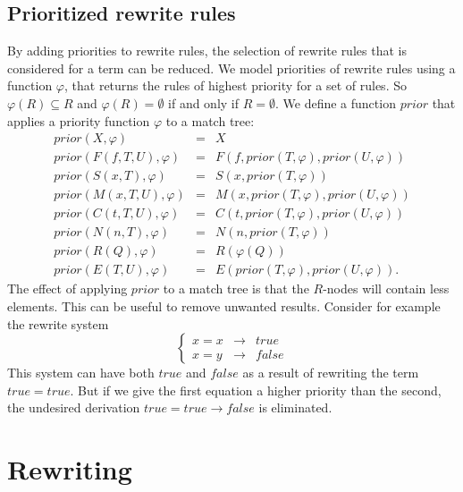 \documentclass{article}
\begin{document}
\subsection{Prioritized rewrite rules}

By adding priorities to rewrite rules, the selection of rewrite rules that
is considered for a term can be reduced. We model priorities of rewrite
rules using a function $\varphi $, that returns the rules of highest
priority for a set of rules. So $\varphi (R)\subseteq R$ and $\varphi
(R)=\emptyset $ if and only if $R=\emptyset $. We define a function $prior$
that applies a priority function $\varphi $ to a match tree:%
\begin{equation*}
\begin{array}{lll}
prior(X,\varphi ) & = & X \\ 
prior(F(f,T,U),\varphi ) & = & F(f,prior(T,\varphi ),prior(U,\varphi )) \\ 
prior(S(x,T),\varphi ) & = & S(x,prior(T,\varphi )) \\ 
prior(M(x,T,U),\varphi ) & = & M(x,prior(T,\varphi ),prior(U,\varphi )) \\ 
prior(C(t,T,U),\varphi ) & = & C(t,prior(T,\varphi ),prior(U,\varphi )) \\ 
prior(N(n,T),\varphi ) & = & N(n,prior(T,\varphi )) \\ 
prior(R(Q),\varphi ) & = & R(\varphi (Q)) \\ 
prior(E(T,U),\varphi ) & = & E(prior(T,\varphi ),prior(U,\varphi )).%
\end{array}%
\end{equation*}%
The effect of applying $prior$ to a match tree is that the $R$-nodes will
contain less elements. This can be useful to remove unwanted results.
Consider for example the rewrite system%
\begin{equation*}
\left\{ 
\begin{array}{ccc}
x=x & \rightarrow & true \\ 
x=y & \rightarrow & false%
\end{array}%
\right.
\end{equation*}%
This system can have both $true$ and $false$ as a result of rewriting the
term $true=true$. But if we give the first equation a higher priority than
the second, the undesired derivation $true=true\rightarrow false$ is
eliminated.

\section{Rewriting}
\end{document}
